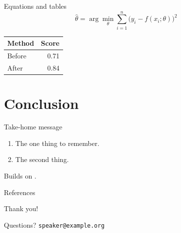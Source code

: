 \documentclass[aspectratio=169,11pt]{beamer} %
\begin{document}
\begin{frame}{Equations and tables}
  \[
    \hat{\theta} = \arg\min_{\theta} \sum_{i=1}^{n} \bigl(y_i - f(x_i;\theta)\bigr)^2
  \]
  \begin{center}
    \begin{tabular}{lr}
      \toprule
      Method & Score \\
      \midrule
      Before & 0.71 \\
      After  & \alert{0.84} \\
      \bottomrule
    \end{tabular}
  \end{center}
\end{frame}

\section{Conclusion}

\begin{frame}{Take-home message}
  \begin{enumerate}
    \item<1-> The one thing to remember.
    \item<2-> The second thing.
  \end{enumerate}
  \vfill
  \small Builds on \textcite{knuth1984}.
\end{frame}

\begin{frame}{References}
  \printbibliography[heading=none]
\end{frame}

\begin{frame}[plain]
  \centering\Huge Thank you!\par\bigskip
  \normalsize Questions? \texttt{speaker@example.org}
\end{frame}
\end{document}
